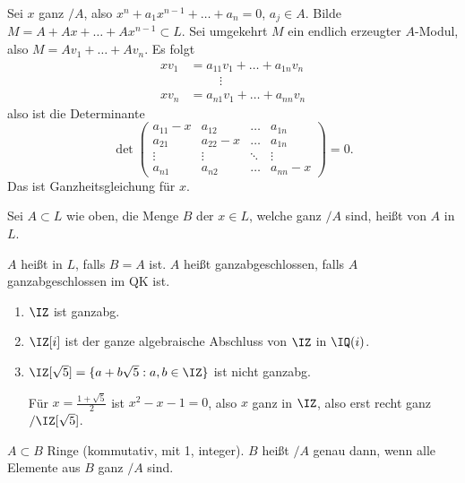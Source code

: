 \begin{Beweis}
 Sei $x$ ganz $/A$, also $x^n+a_1x^{n-1}+\ldots+a_n=0$, $a_j\in A$. Bilde $M=A+Ax+\ldots+ Ax^{n-1}\subset L$. Sei umgekehrt $M$ ein endlich erzeugter $A$-Modul, also $M=Av_1+\ldots+ Av_n$.
 Es folgt \begin{align*}
           xv_1&= a_{11}v_1+\ldots+ a_{1n}v_n\\
           & \hspace{1cm}\vdots\\
           xv_n&= a_{n1}v_1+\ldots+ a_{nn}v_n
          \end{align*}
also ist die Determinante
\[\det\begin{pmatrix}
       a_{11}-x & a_{12} & \hdots & a_{1n}\\
       a_{21} & a_{22}-x & \hdots & a_{1n}\\
       \vdots & \vdots & \ddots & \vdots\\
       a_{n1} & a_{n2} & \hdots & a_{nn}-x
      \end{pmatrix}=0.
\]
Das ist Ganzheitsgleichung für $x$.
\end{Beweis}

\begin{Definition}
 Sei $A\subset L$ wie oben, die Menge $B$ der $x\in L$, welche ganz $/A$ sind, heißt  von $A$ in $L$.
 
 $A$ heißt  in $L$, falls $B=A$ ist. $A$ heißt ganzabgeschlossen, falls $A$ ganzabgeschlossen im QK ist.
\end{Definition}

\begin{Beispiel}
 \begin{enumerate}
  \item $\IZ$ ist ganzabg.
  \item $\IZ[i]$ ist der ganze algebraische Abschluss von $\IZ$ in $\IQ(i)$.
  \item $\IZ[\sqrt{5}]=\{a+b\sqrt{5} : a,b\in\IZ\}$ ist nicht ganzabg.
  
  Für $x=\frac{1+\sqrt{5}}{2}$ ist $x^2-x-1=0$, also $x$ ganz in $\IZ$, also erst recht ganz $/\IZ[\sqrt{5}]$.
 \end{enumerate}
\end{Beispiel}

\begin{Definition}
 $A\subset B$ Ringe (kommutativ, mit 1, integer). $B$ heißt  $/A$ genau dann, wenn alle Elemente aus $B$ ganz $/A$ sind.
\end{Definition}

